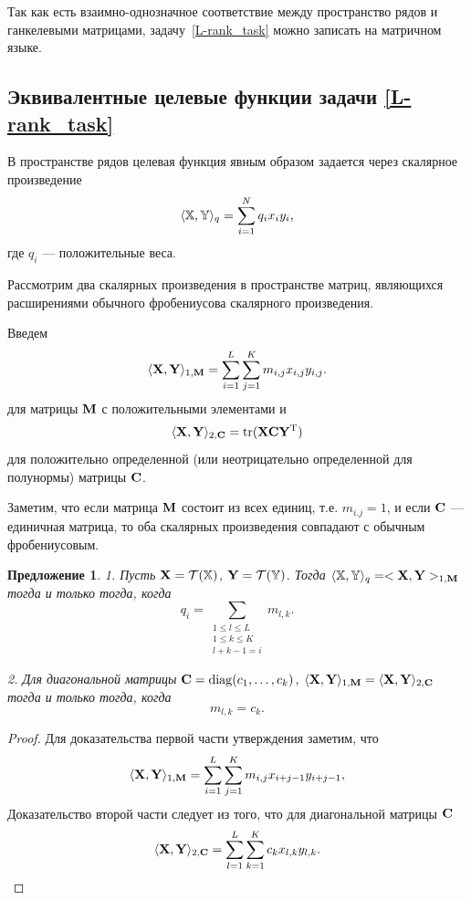 \documentclass[12pt,a4paper,fleqn,leqno]{article}
\DeclareMathOperator{\tr}{tr}
\newtheorem{proposition}{Предложение}%
\begin{document}
Так как есть взаимно-однозначное соответствие между пространство рядов и ганкелевыми матрицами,
задачу~\eqref{L-rank_task} можно записать на матричном языке.

\subsection{Эквивалентные целевые функции задачи \eqref{L-rank_task}}
В пространстве рядов целевая функция явным образом задается через скалярное произведение
\begin{equation}
\label{eq:norm_ser}
    \langle\mathbb{X},\mathbb{Y}\rangle_q = \sum_{i = 1}^N q_i x_i y_i,
\end{equation}
где $q_i$ --- положительные веса.

Рассмотрим два скалярных произведения в пространстве матриц, являющихся расширениями
обычного фробениусова скалярного произведения.

Введем
\begin{equation}
\label{eq:norm1M}
    \langle\mathbf{X},\mathbf{Y}\rangle_{1,\mathbf{M}} = \sum_{i = 1}^L \sum_{j=1}^K m_{i,j} x_{i,j} y_{i,j}.
\end{equation}
для матрицы $\mathbf{M}$ с положительными элементами и
\begin{equation}
\label{eq:norm2S}
    \langle\bfX,\bfY\rangle_{2,\bfC} = \tr(\bfX \bfC \bfY^\rmT)
\end{equation}
для положительно определенной (или неотрицательно определенной для полунормы) матрицы $\mathbf{C}$.

Заметим, что если матрица $\mathbf{M}$ состоит из всех единиц, т.е. $m_{i.j}=1$,
и если $\mathbf{C}$ --- единичная матрица, то оба скалярных произведения совпадают
с обычным фробениусовым.

\begin{proposition}
\label{prop:equiv_tasks}
1. Пусть $\mathbf{X} = \mathcal{T}(\mathbb{X})$,  $\mathbf{Y} = \mathcal{T}(\mathbb{Y})$. Тогда $\langle\mathbb{X},\mathbb{Y}\rangle_q= <\mathbf{X},\mathbf{Y}>_{1,\mathbf{M}}$ тогда и только тогда, когда
\begin{equation}\label{qi_mi}
q_i = \sum_{\substack{1 \le l \le L \\ 1 \le k \le K \\ l+k-1=i}} m_{l,k}.
\end{equation}

2. Для диагональной матрицы $\mathbf{C}=\mathop{\mathrm{diag}}(c_1,\ldots,c_k)$, $\langle\mathbf{X},\mathbf{Y}\rangle_{1,\mathbf{M}}= \langle\mathbf{X},\mathbf{Y}\rangle_{2,\mathbf{C}}$ тогда и только тогда, когда
\begin{equation}\label{sk_mlk}
m_{l,k}=c_k.
\end{equation}
\end{proposition}
\begin{proof}
Для доказательства первой части утверждения заметим, что
\begin{equation*}
\langle \mathbf{X}, \mathbf{Y} \rangle_{1,\mathbf{M}} = \sum_{i = 1}^L \sum_{j = 1}^K m_{i,j} x_{i + j - 1} y_{i + j - 1},
\end{equation*}
Доказательство второй части следует из того, что для диагональной матрицы $\mathbf{C}$
\begin{equation*}
\langle \mathbf{X}, \mathbf{Y} \rangle_{2,\mathbf{C}} = \sum_{l=1}^L \sum_{k=1}^K c_k x_{l,k} y_{l, k}.
\end{equation*}
\end{proof}
\end{document}
